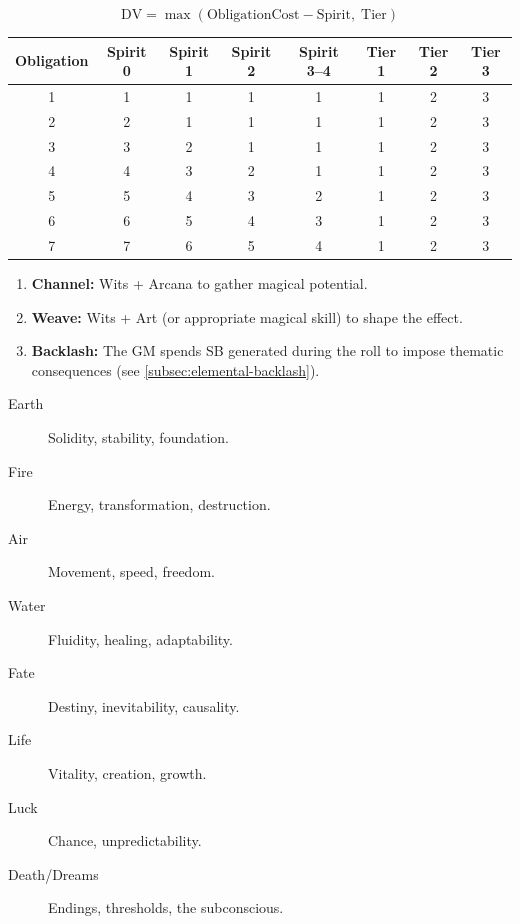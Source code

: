 \begin{tcolorbox}[title=DV Reference for Rites, colback=white!97!gray, colframe=black!80!gray,breakable]
\[
\mathrm{DV} = \max(\text{ObligationCost} - \text{Spirit},\; \text{Tier})
\]

\begin{tabular}{c|cccc|c|c|c}
Obligation & Spirit 0 & Spirit 1 & Spirit 2 & Spirit 3--4 & Tier 1 & Tier 2 & Tier 3 \\
\hline
1 & 1 & 1 & 1 & 1 & 1 & 2 & 3 \\
2 & 2 & 1 & 1 & 1 & 1 & 2 & 3 \\
3 & 3 & 2 & 1 & 1 & 1 & 2 & 3 \\
4 & 4 & 3 & 2 & 1 & 1 & 2 & 3 \\
5 & 5 & 4 & 3 & 2 & 1 & 2 & 3 \\
6 & 6 & 5 & 4 & 3 & 1 & 2 & 3 \\
7 & 7 & 6 & 5 & 4 & 1 & 2 & 3 \\
\end{tabular}
\end{tcolorbox}

\begin{tcolorbox}[title=Casting Loop Summary, colback=white!97!gray, colframe=black!80!gray,breakable]
\begin{enumerate}
  \item \textbf{Channel:} Wits + Arcana to gather magical potential.
  \item \textbf{Weave:} Wits + Art (or appropriate magical skill) to shape the effect.
  \item \textbf{Backlash:} The GM spends SB generated during the roll to impose thematic consequences (see \ref{subsec:elemental-backlash}).
\end{enumerate}
\end{tcolorbox}

\begin{tcolorbox}[title=Eight Elements of Magic, colback=white!97!gray, colframe=black!80!gray,breakable]
\begin{description}
  \item[Earth] Solidity, stability, foundation.
  \item[Fire] Energy, transformation, destruction.
  \item[Air] Movement, speed, freedom.
  \item[Water] Fluidity, healing, adaptability.
  \item[Fate] Destiny, inevitability, causality.
  \item[Life] Vitality, creation, growth.
  \item[Luck] Chance, unpredictability.
  \item[Death/Dreams] Endings, thresholds, the subconscious.
\end{description}
\end{tcolorbox}

